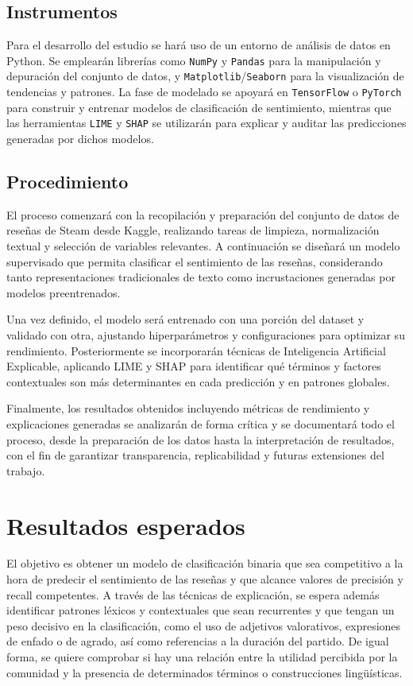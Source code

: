 \documentclass{article}
\begin{document}
\subsection{Instrumentos}
Para el desarrollo del estudio se hará uso de un entorno de análisis de datos en Python. Se emplearán librerías como \texttt{NumPy} y \texttt{Pandas} para la manipulación y depuración del conjunto de datos, y \texttt{Matplotlib}/\texttt{Seaborn} para la visualización de tendencias y patrones. La fase de modelado se apoyará en \texttt{TensorFlow} o \texttt{PyTorch} para construir y entrenar modelos de clasificación de sentimiento, mientras que las herramientas \texttt{LIME} y \texttt{SHAP} se utilizarán para explicar y auditar las predicciones generadas por dichos modelos.

\subsection{Procedimiento}
El proceso comenzará con la recopilación y preparación del conjunto de datos de reseñas de Steam desde Kaggle, realizando tareas de limpieza, normalización textual y selección de variables relevantes. A continuación se diseñará un modelo supervisado que permita clasificar el sentimiento de las reseñas, considerando tanto representaciones tradicionales de texto como incrustaciones generadas por modelos preentrenados.

Una vez definido, el modelo será entrenado con una porción del dataset y validado con otra, ajustando hiperparámetros y configuraciones para optimizar su rendimiento. Posteriormente se incorporarán técnicas de Inteligencia Artificial Explicable, aplicando LIME y SHAP para identificar qué términos y factores contextuales son más determinantes en cada predicción y en patrones globales.

Finalmente, los resultados obtenidos incluyendo métricas de rendimiento y explicaciones generadas se analizarán de forma crítica y se documentará todo el proceso, desde la preparación de los datos hasta la interpretación de resultados, con el fin de garantizar transparencia, replicabilidad y futuras extensiones del trabajo.


\section{Resultados esperados}
El objetivo es obtener un modelo de clasificación binaria que sea competitivo a la hora de predecir el sentimiento de las reseñas y que alcance valores de precisión y recall competentes. A través de las técnicas de explicación, se espera además identificar patrones léxicos y contextuales que sean recurrentes y que tengan un peso decisivo en la clasificación, como el uso de adjetivos valorativos, expresiones de enfado o de agrado, así como referencias a la duración del partido. De igual forma, se quiere comprobar si hay una relación entre la utilidad percibida por la comunidad y la presencia de determinados términos o construcciones lingüísticas.
\end{document}
